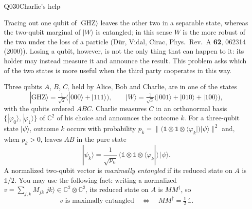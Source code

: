 %
%
\begin{entry}{Q030}{Charlie's help}


\begin{problem}
Tracing out one qubit of $|\mathrm{GHZ}\rangle$ leaves the other two in a
separable state, whereas the two-qubit marginal of $|W\rangle$ is entangled;
in this sense $W$ is the more robust of the two under the loss of a particle
(D\"ur, Vidal, Cirac, Phys.\ Rev.\ A \textbf{62}, 062314 (2000)). Losing a
qubit, however, is not the only thing that can happen to it: its holder may
instead measure it and announce the result. This problem asks which of the
two states is more useful when the third party cooperates in this way.

Three qubits $A$, $B$, $C$, held by Alice, Bob and Charlie, are in one of
the states
\begin{equation}\label{eq:q030-states}
  |\mathrm{GHZ}\rangle = \tfrac{1}{\sqrt2}\big(|000\rangle + |111\rangle\big),
  \qquad
  |W\rangle = \tfrac{1}{\sqrt3}\big(|001\rangle + |010\rangle + |100\rangle\big),
\end{equation}
with the qubits ordered $ABC$. Charlie measures $C$ in an orthonormal basis
$\{|\varphi_0\rangle, |\varphi_1\rangle\}$ of $\mathbb{C}^2$ of his choice
and announces the outcome $k$. For a three-qubit state $|\psi\rangle$,
outcome $k$ occurs with probability
$p_k = \big\|(\mathds{1}\otimes\mathds{1}\otimes\langle\varphi_k|)
|\psi\rangle\big\|^2$ and, when $p_k > 0$, leaves $AB$ in the pure state
\begin{equation}\label{eq:q030-post}
  |\psi_k\rangle = \frac{1}{\sqrt{p_k}}\,
  (\mathds{1}\otimes\mathds{1}\otimes\langle\varphi_k|)\,|\psi\rangle .
\end{equation}
A normalized two-qubit vector is \emph{maximally entangled} if its reduced
state on $A$ is $\mathds{1}/2$. You may use the following fact: writing a
normalized $v = \sum_{j,k} M_{jk}|jk\rangle \in \mathbb{C}^2\otimes
\mathbb{C}^2$, its reduced state on $A$ is $MM^\dagger$, so
\begin{equation}\label{eq:q030-max}
  v \text{ is maximally entangled}
  \quad\Longleftrightarrow\quad
  MM^\dagger = \tfrac12\,\mathds{1}.
\end{equation}


\end{problem}
\end{entry}
